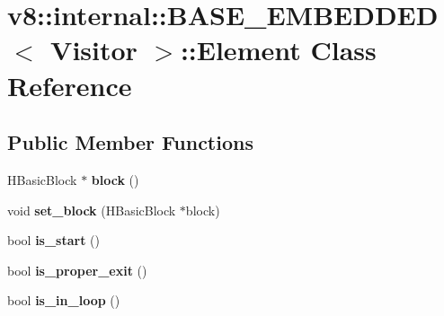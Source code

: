 \hypertarget{classv8_1_1internal_1_1_b_a_s_e___e_m_b_e_d_d_e_d_1_1_element}{}\section{v8\+:\+:internal\+:\+:B\+A\+S\+E\+\_\+\+E\+M\+B\+E\+D\+D\+E\+D$<$ Visitor $>$\+:\+:Element Class Reference}
\label{classv8_1_1internal_1_1_b_a_s_e___e_m_b_e_d_d_e_d_1_1_element}
\subsection*{Public Member Functions}
\begin{DoxyCompactItemize}
\item 
\hypertarget{classv8_1_1internal_1_1_b_a_s_e___e_m_b_e_d_d_e_d_1_1_element_aead3b514c237421a51b116601ed3a702}{}H\+Basic\+Block $\ast$ {\bfseries block} ()\label{classv8_1_1internal_1_1_b_a_s_e___e_m_b_e_d_d_e_d_1_1_element_aead3b514c237421a51b116601ed3a702}

\item 
\hypertarget{classv8_1_1internal_1_1_b_a_s_e___e_m_b_e_d_d_e_d_1_1_element_a4bd396f145da8141412b1c6e0ed9ca31}{}void {\bfseries set\+\_\+block} (H\+Basic\+Block $\ast$block)\label{classv8_1_1internal_1_1_b_a_s_e___e_m_b_e_d_d_e_d_1_1_element_a4bd396f145da8141412b1c6e0ed9ca31}

\item 
\hypertarget{classv8_1_1internal_1_1_b_a_s_e___e_m_b_e_d_d_e_d_1_1_element_adc79898f4518665e57ee99bd7953eb37}{}bool {\bfseries is\+\_\+start} ()\label{classv8_1_1internal_1_1_b_a_s_e___e_m_b_e_d_d_e_d_1_1_element_adc79898f4518665e57ee99bd7953eb37}

\item 
\hypertarget{classv8_1_1internal_1_1_b_a_s_e___e_m_b_e_d_d_e_d_1_1_element_ac1e427eb2d72f08495ef664656a9249f}{}bool {\bfseries is\+\_\+proper\+\_\+exit} ()\label{classv8_1_1internal_1_1_b_a_s_e___e_m_b_e_d_d_e_d_1_1_element_ac1e427eb2d72f08495ef664656a9249f}

\item 
\hypertarget{classv8_1_1internal_1_1_b_a_s_e___e_m_b_e_d_d_e_d_1_1_element_aa935226c5e36fa12487b5aab60c62233}{}bool {\bfseries is\+\_\+in\+\_\+loop} ()\label{classv8_1_1internal_1_1_b_a_s_e___e_m_b_e_d_d_e_d_1_1_element_aa935226c5e36fa12487b5aab60c62233}


\end{DoxyCompactItemize}
